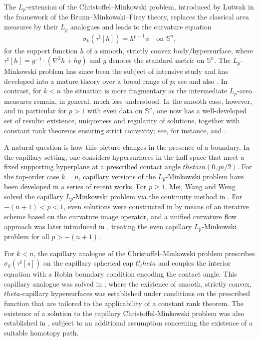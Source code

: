 \documentclass[12pt]{amsart}
\def\theta{theta}%
\def\pi{pi}%
\def\in{in }%
\numberwithin{equation}{section}
\newcommand{\bbS}{\mathbb{S}}
\newcommand{\8}{\infty}
\newcommand{\si}{\sigma}
\newcommand{\cC}{\mathcal{C}}
\newcommand{\eq}[1]{\begin{equation}\begin{alignedat}{2}#1\end{alignedat}\end{equation}}
\newcommand{\Cth}{\cC_\theta}
\begin{document}
The $L_p$-extension of the Christoffel--Minkowski problem, introduced by Lutwak \cite{Lut93} in the framework of the Brunn--Minkowski--Firey theory, replaces the classical area measures by their $L_p$ analogues and leads to the curvature equation
\eq{
  \si_k(\tau^\sharp[h]) = h^{p-1}\phi \quad \text{on }\bbS^n,
}
for the support function $h$ of a smooth, strictly convex body/hypersurface, where $\tau^\sharp[h]=g^{-1}\cdot(\nabla^2 h+h g)$ and $g$ denotes the standard metric on $\bbS^n$. The $L_p$-Minkowski problem has since been the subject of intensive study and has developed into a mature theory over a broad range of $p$; see \cite{LO95,CW06,BLYZ13,HLYZ16,BBCY19,HXZ21,GLW22,LXYZ24} and also \cite{CW00,BIS19,LWW20,CL21,BIS21b,BG23}. In contrast, for $k<n$ the situation is more fragmentary as  the intermediate $L_p$-area measures remain, in general, much less understood. In the smooth case, however, and in particular for $p>1$ with even data on $\bbS^n$, one now has a well-developed set of results: existence, uniqueness and regularity of solutions, together with constant rank theorems ensuring strict convexity; see, for instance, \cite{GM03,HMS04,GLM06,GMZ06,GX18,Iva19,BIS23,BIS23b,HI24,Zha24,CH25} and \cite{BIS21,HLX24,LW24}.

A natural question is how this picture changes in the presence of a boundary. In the capillary setting, one considers hypersurfaces in the half-space that meet a fixed supporting hyperplane at a prescribed contact angle $\theta\in(0,\pi/2)$. For the top-order case $k=n$, capillary versions of the $L_p$-Minkowski problem have been developed in a series of recent works. For $p\ge 1$, Mei, Wang and Weng solved the capillary $L_p$-Minkowski problem via the continuity method in \cite{MWW25a,MWW25c}. For $-(n+1)<p<1$, even solutions were constructed in \cite{HI25} by means of an iterative scheme based on the curvature image operator, and a unified curvature flow approach was later introduced in \cite{HHI25}, treating the even capillary $L_p$-Minkowski problem for all $p>-(n+1)$.

For $ k<n$, the capillary analogue of the Christoffel--Minkowski problem prescribes $\si_k(\tau^\sharp[s])$ on the capillary spherical cap $\Cth$ and couples the interior equation with a Robin boundary condition encoding the contact angle. This capillary analogue was solved in \cite{HIS25}, where the existence of smooth, strictly convex, $\theta$-capillary hypersurfaces was established under conditions on the prescribed function that are tailored to the applicability of a constant rank theorem. The existence of a solution to the capillary Christoffel-Minkowski problem was also established in \cite{MWW25c}, subject to an additional assumption concerning the existence of a suitable homotopy path.
\end{document}
